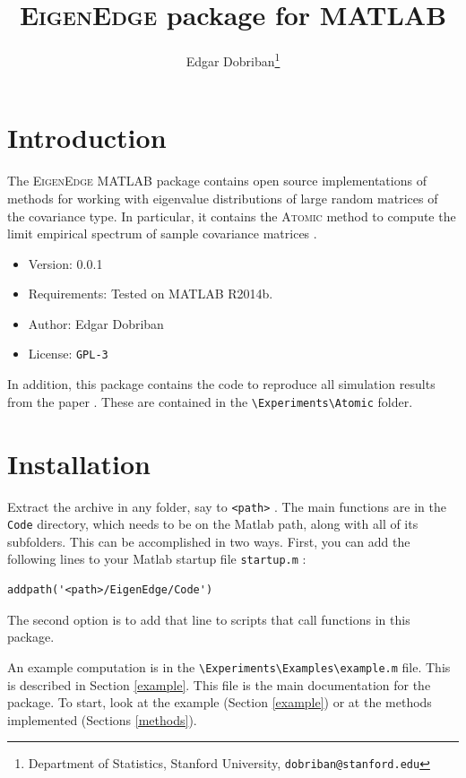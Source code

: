 \documentclass[english,11pt]{article} %
\title{\textsc{EigenEdge} package for MATLAB}
\author{Edgar Dobriban\thanks{Department of Statistics, Stanford University, \texttt{dobriban@stanford.edu}} }
\begin{document}
\maketitle
\tableofcontents
\section{Introduction}

The \textsc{EigenEdge} MATLAB package contains open source implementations of methods for working with eigenvalue distributions of large random matrices of the covariance type. In particular, it contains the \textsc{Atomic} method to compute the limit empirical spectrum of sample covariance matrices \citep[proposed in][]{dobriban2015precise}. %

\begin{itemize}
\item{Version: } 0.0.1
\item{Requirements: } Tested on MATLAB R2014b. 
\item{Author: } Edgar Dobriban
\item{License: } \verb+GPL-3+
\end{itemize}

In addition, this package contains the code to reproduce all simulation results from the paper \cite{dobriban2015precise}. These are contained in the \verb+\Experiments\Atomic+ folder.

\section{Installation}

Extract the archive in any folder, say to \verb+<path>+ . The main functions are in the \verb+Code+ directory, which needs to be on the Matlab path, along with all of its subfolders. This can be accomplished in two ways. First, you can add the following lines to your Matlab startup file \verb+startup.m+ :

\begin{verbatim}
addpath('<path>/EigenEdge/Code')
\end{verbatim}

The second option is to add that line to scripts that call functions in this package. 

An example computation is in the \verb+\Experiments\Examples\example.m+ file. This is described in Section \ref{example}. This file is the main documentation for the package. To start, look at the example (Section \ref{example}) or at the methods implemented (Sections \ref{methods}).
\end{document}
